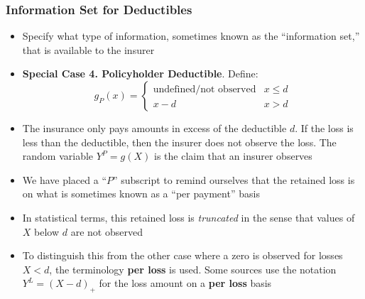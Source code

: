 \documentclass{beamer}
\begin{document}
\begin{frame}%
\frametitle{Information Set for Deductibles}
\begin{itemize}
\item Specify what type of information, sometimes known as the ``information set,'' that is available to the
insurer %
\item \textbf{Special Case 4. Policyholder Deductible}. Define:
\begin{equation*}
g_P(x) =
\begin{cases}
\text{undefined/not observed} & x \le d\\
x - d & x > d
\end{cases}
\end{equation*} %
\item The insurance only pays amounts in excess of the deductible $d$. If the loss is less than the deductible, then the insurer does not observe the loss. The random variable $Y^P = g(X)$ is the claim that an insurer
observes %
\item We have placed a ``$P$'' subscript to remind ourselves that the retained loss is on what is sometimes known as a ``per payment'' basis %
\item In statistical terms, this retained loss is \emph{truncated} in the sense that values of $X$ below $d$ are not
observed %
 \item To distinguish this from the other case where a zero is observed for losses $X<d$, the terminology \textbf{per loss} is used.  Some sources use the notation $Y^L = (X-d)_+$ for the loss amount on a \textbf{per loss} basis
\end{itemize}
\end{frame}
\end{document}
